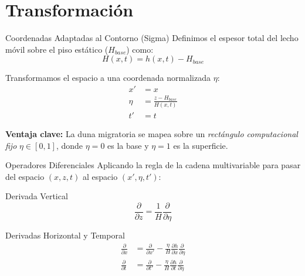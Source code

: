 \documentclass[10pt]{beamer}
\begin{document}
\section{Transformación}

\begin{frame}{Coordenadas Adaptadas al Contorno (Sigma)}
    Definimos el espesor total del lecho móvil sobre el piso estático ($H_{base}$) como:
    \begin{equation*}
        H(x,t) = h(x,t) - H_{base}
    \end{equation*}
    
    Transformamos el espacio a una coordenada normalizada $\eta$:
    \begin{align}
        x' &= x \\
        \eta &= \frac{z - H_{base}}{H(x,t)} \\
        t' &= t
    \end{align}
    
    \textbf{Ventaja clave:} La duna migratoria se mapea sobre un \textit{rectángulo computacional fijo} $\eta \in [0,1]$, donde $\eta=0$ es la base y $\eta=1$ es la superficie.
\end{frame}

\begin{frame}{Operadores Diferenciales}
    Aplicando la regla de la cadena multivariable para pasar del espacio $(x,z,t)$ al espacio $(x',\eta,t')$:
    
    \begin{block}{Derivada Vertical}
        \begin{equation}
            \frac{\partial}{\partial z} = \frac{1}{H} \frac{\partial}{\partial \eta}
        \end{equation}
    \end{block}
    
    \begin{block}{Derivadas Horizontal y Temporal}
        \begin{align}
            \frac{\partial}{\partial x} &= \frac{\partial}{\partial x'} - \frac{\eta}{H} \frac{\partial h}{\partial x} \frac{\partial}{\partial \eta} \\
            \frac{\partial}{\partial t} &= \frac{\partial}{\partial t'} - \frac{\eta}{H} \frac{\partial h}{\partial t} \frac{\partial}{\partial \eta}
        \end{align}
    \end{block}
\end{frame}
\end{document}
